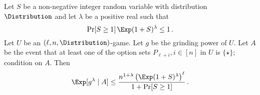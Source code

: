     \begin{lemma}
        \label{lemma:adaptive-moment}
        Let $S$ be a non-negative integer random variable with distribution $\Distribution$ 
        and let $\lambda$ be a positive real such that 
        \begin{equation}\label{eq:lambda-S-requirement}
            \Pr[S \geq 1]\,\Exp (1 + S)^\lambda \leq 1  
            \,.
        \end{equation}
        Let $U$ be an $(\ell, n, \Distribution)$-game.
        Let $g$ be the grinding power of $U$. 
        Let $A$ be the event that 
        at least one of the option sets $P_{\ell + i}, i \in [n]$ in $U$ is $\{\star\}$; 
        {\color{red}condition on $A$.}
        Then 
        $$
            \Exp[g^\lambda \mid A] \leq 
                \frac{n^{1 + \lambda} \left(\Exp (1 + S)^\lambda\right)^{\ell}}{1 + \Pr[S \geq 1]}            
                \,.
        $$
    \end{lemma}

